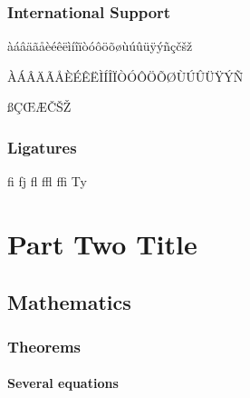 \documentclass[
	11pt, %
	fleqn, %
	a4paper, %
]{LegrandOrangeBook}
\begin{document}



\section{International Support}

àáâäãåèéêëìíîïòóôöõøùúûüÿýñçčšž

\noindent ÀÁÂÄÃÅÈÉÊËÌÍÎÏÒÓÔÖÕØÙÚÛÜŸÝÑ

\noindent ßÇŒÆČŠŽ




\section{Ligatures}

fi fj fl ffl ffi Ty




\part{Part Two Title}









\chapter{Mathematics}



\section{Theorems}



\subsection{Several equations}
\end{document}
